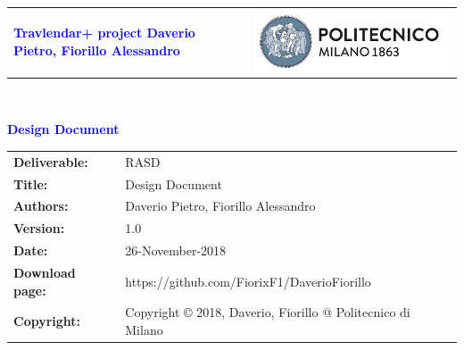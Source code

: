 




\begin{titlepage}



{\begin{table}[t!]
\centering
\begin{tabu} to \textwidth { X[1.3,r,p] X[1.7,l,p] }
\textcolor{Blue}
{\textbf{\small{Travlendar+ project Daverio Pietro, Fiorillo Alessandro}}} & \includegraphics[scale=0.5]{Images/PolimiLogo}
\end{tabu}
\end{table}}~\\ [7cm]


\begin{flushleft}

{\textcolor{Blue}{\textbf{\Huge{Design Document}}}} \\ [1cm]

\end{flushleft}

\end{titlepage}

\begin{table}[h!]
\begin{tabu} to \textwidth { X[0.3,r,p] X[0.7,l,p] }
\hline

\textbf{Deliverable:} & RASD\\
\textbf{Title:} & Design Document \\
\textbf{Authors:} & Daverio Pietro, Fiorillo Alessandro \\
\textbf{Version:} & 1.0 \\ 
\textbf{Date:} & 26-November-2018 \\
\textbf{Download page:} & https://github.com/FiorixF1/DaverioFiorillo \\
\textbf{Copyright:} & Copyright © 2018, Daverio, Fiorillo @ Politecnico di Milano \\
\hline
\end{tabu}
\end{table}




